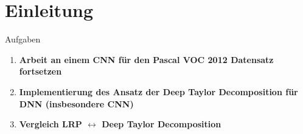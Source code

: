 \section{Einleitung}
\begin{frame}{Aufgaben}
\begin{large}
\begin{center}
\vspace*{1cm}
\begin{minipage}{0.9\textwidth}
\begin{enumerate}
\item \textbf{Arbeit an einem CNN für den Pascal VOC 2012 Datensatz fortsetzen}
\vspace*{10pt}
\item \textbf{Implementierung des Ansatz der Deep Taylor Decomposition für DNN (insbesondere CNN)}
\vspace*{0pt}
\item \textbf{Vergleich LRP $\leftrightarrow$ Deep Taylor Decomposition}
\end{enumerate}
\end{minipage}
\end{center}
\end{large}
\end{frame}